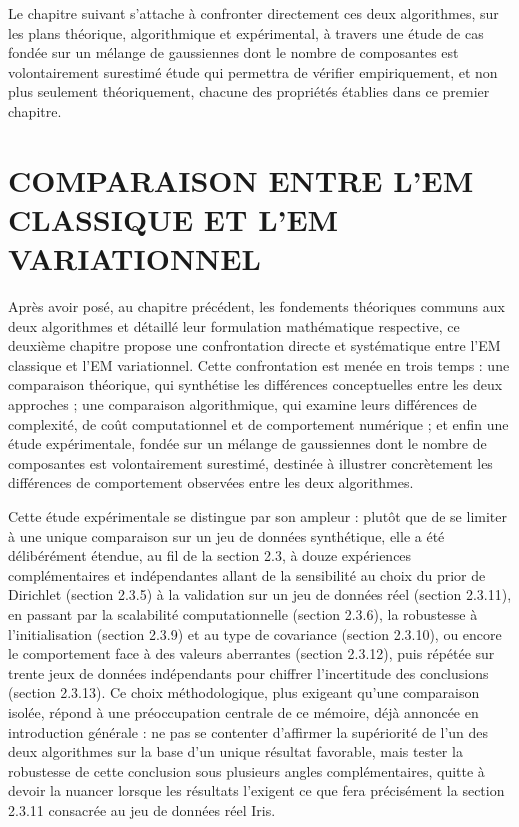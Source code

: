 Le chapitre suivant s'attache à confronter directement ces deux algorithmes, sur les plans théorique, algorithmique et expérimental, à travers une étude de cas fondée sur un mélange de gaussiennes dont le nombre de composantes est volontairement surestimé  étude qui permettra de vérifier empiriquement, et non plus seulement théoriquement, chacune des propriétés établies dans ce premier chapitre.


\chapter{COMPARAISON ENTRE L'EM CLASSIQUE ET L'EM VARIATIONNEL}
Après avoir posé, au chapitre précédent, les fondements théoriques communs aux deux algorithmes et détaillé leur formulation mathématique respective, ce deuxième chapitre propose une confrontation directe et systématique entre l'EM classique et l'EM variationnel. Cette confrontation est menée en trois temps : une comparaison théorique, qui synthétise les différences conceptuelles entre les deux approches ; une comparaison algorithmique, qui examine leurs différences de complexité, de coût computationnel et de comportement numérique ; et enfin une étude expérimentale, fondée sur un mélange de gaussiennes dont le nombre de composantes est volontairement surestimé, destinée à illustrer concrètement les différences de comportement observées entre les deux algorithmes.

Cette étude expérimentale se distingue par son ampleur : plutôt que de se limiter à une unique comparaison sur un jeu de données synthétique, elle a été délibérément étendue, au fil de la section 2.3, à douze expériences complémentaires et indépendantes  allant de la sensibilité au choix du prior de Dirichlet (section 2.3.5) à la validation sur un jeu de données réel (section 2.3.11), en passant par la scalabilité computationnelle (section 2.3.6), la robustesse à l'initialisation (section 2.3.9) et au type de covariance (section 2.3.10), ou encore le comportement face à des valeurs aberrantes (section 2.3.12), puis répétée sur trente jeux de données indépendants pour chiffrer l'incertitude des conclusions (section 2.3.13). Ce choix méthodologique, plus exigeant qu'une comparaison isolée, répond à une préoccupation centrale de ce mémoire, déjà annoncée en introduction générale : ne pas se contenter d'affirmer la supériorité de l'un des deux algorithmes sur la base d'un unique résultat favorable, mais tester la robustesse de cette conclusion sous plusieurs angles complémentaires, quitte à devoir la nuancer lorsque les résultats l'exigent  ce que fera précisément la section 2.3.11 consacrée au jeu de données réel Iris.

